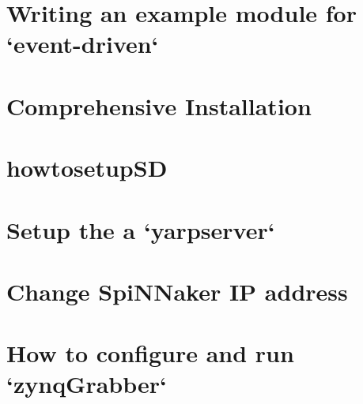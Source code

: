 \documentclass[twoside]{book}
\newcommand{\+}{\discretionary{\mbox{\scriptsize$\hookleftarrow$}}{}{}}
\begin{document}
\chapter{Writing an example module for `event-\/driven`}
\label{md__media_workspace_projects_event-driven_documentation_example_module}

\chapter{Comprehensive Installation}
\label{md__media_workspace_projects_event-driven_documentation_full_installation}

\chapter{howtosetup\+SD}
\label{md__media_workspace_projects_event-driven_documentation_howtosetupSD}

\chapter{Setup the a `yarpserver`}
\label{md__media_workspace_projects_event-driven_documentation_setup_yarpserver}

\chapter{Change Spi\+N\+Naker IP address}
\label{md__media_workspace_projects_event-driven_documentation_SpiNNakerips}

\chapter{How to configure and run `zynq\+Grabber`}
\label{md__media_workspace_projects_event-driven_documentation_zynqGrabber}

\end{document}
